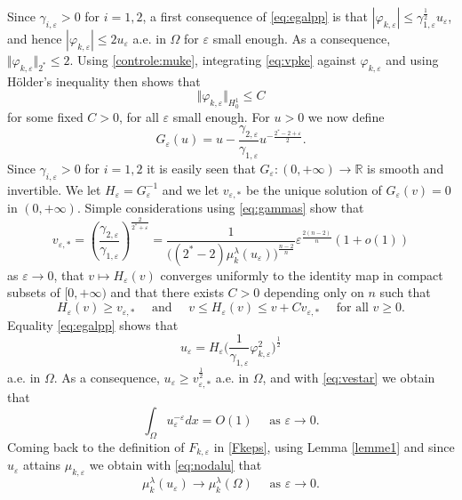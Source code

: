 \documentclass[10pt]{amsart}
\numberwithin{equation}{section}
\newcommand{\R}{\mathbb{R}}
\newcommand{\ve}{\varepsilon}
\newcommand{\vp}{\varphi}
\newcommand{\Om}{\Omega}
\newcommand{\mkl}{\mu_{k}^{\lambda}}
\newcommand{\mkle}{\mu_{k,\ve}}
\newcommand{\Fke}{F_{k,\ve}}
\theoremstyle{plain}
\theoremstyle{remark}
\begin{document}
Since $\gamma_{i,\ve} >0$ for $i=1,2$, a first consequence of \eqref{eq:egalpp} is that $|\vp_{k,\ve}| \le \gamma_{1,\ve}^{\frac12} u_\ve$, and hence $|\vp_{k,\ve}| \le 2 u_\ve$ a.e. in $\Om$ for $\ve$ small enough. As a consequence, $\Vert \vp_{k,\ve} \Vert_{2^*} \le 2$. Using \eqref{controle:muke}, integrating \eqref{eq:vpke} against $\vp_{k,\ve}$ and using H\"older's inequality then shows that 
\begin{equation} \label{eq:bornitude:vpke}
\Vert \vp_{k,\ve} \Vert_{H^1_0} \le C
\end{equation}
for some fixed $C >0$, for all $\ve$ small enough. For $u >0$ we now define
 $$G_\ve(u) = u - \frac{\gamma_{2,\ve}}{\gamma_{1,\ve}}  u^{- \frac{2^*-2+\ve}{2}}. $$
 Since $\gamma_{i,\ve} >0$ for $i=1,2$ it is easily seen that $G_\ve: (0, + \infty) \to \R$ is smooth and invertible. We let $H_\ve = G_\ve^{-1}$ and we let $v_{\ve, *}$ be the unique solution of $G_\ve(v) = 0$ in $(0, + \infty)$. Simple considerations using \eqref{eq:gammas} show that 
 \begin{equation} \label{eq:vestar}
 v_{\ve,*} = \left( \frac{\gamma_{2,\ve}}{\gamma_{1,\ve}} \right)^{\frac{2}{2^*+\ve}} = \frac{1}{\big((2^*-2) \mkl(u_\ve)\big)^{\frac{n-2}{n}}} \ve^{\frac{2(n-2)}{n}} (1+ o(1)) 
 \end{equation}
  as $\ve \to 0$, that $v \mapsto H_\ve(v)$ converges uniformly to the identity map in compact subsets of $[0, + \infty)$ and that there exists $C>0$ depending only on $n$ such that
 \begin{equation} 
  \label{eq:propG}  
  H_\ve(v) \ge v_{\ve, *} \quad \text{ and } \quad v \le H_\ve(v) \le v +C v_{\ve, *} \quad \text{ for all } v \ge 0.
 \end{equation}
 Equality \eqref{eq:egalpp} shows that
  \begin{equation}  \label{eq:egalG}
   u_\ve = H_\ve \Big( \frac{1}{\gamma_{1,\ve}} \vp_{k,\ve}^2 \Big)^{\frac12} 
  \end{equation} 
a.e. in $\Om$. As a consequence, $u_\ve \ge v_{\ve,*}^{\frac12}$ a.e. in $\Om$, and with \eqref{eq:vestar} we obtain that 
\begin{equation} \label{eq:nodalu}
\int_{\Om} u_\ve^{-\ve}dx = O(1) \quad \text{ as } \ve \to 0.
\end{equation} Coming back to the definition of $\Fke$ in \eqref{Fkeps}, using Lemma \ref{lemme1} and since $u_\ve$ attains $\mkle$ we obtain with \eqref{eq:nodalu} that
\begin{equation} \label{eq:convmkl}
\mkl(u_\ve) \to \mkl(\Om) \quad \text{ as } \ve \to 0. 
 \end{equation}
\end{document}
